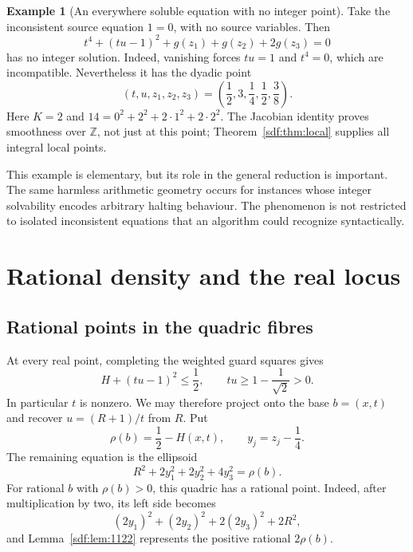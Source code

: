 \documentclass[11pt,a4paper]{article}
\theoremstyle{definition}
\newtheorem{example}[theorem]{Example}
\theoremstyle{remark}
\newcommand{\Z}{\mathbb Z}
\newcommand{\guard}{g}
\begin{document}
\begin{example}[An everywhere soluble equation with no integer point]\label{sdf:ex:one}
Take the inconsistent source equation $1=0$, with no source variables.
Then
\begin{equation}\label{sdf:eq:inconsistent}
 t^4+(tu-1)^2+\guard(z_1)+\guard(z_2)+2\guard(z_3)=0
\end{equation}
has no integer solution. Indeed, vanishing forces $tu=1$ and $t^4=0$,
which are incompatible. Nevertheless it has the dyadic point
\[
 \left(t,u,z_1,z_2,z_3\right)
 =\left(\frac12,3,\frac14,\frac12,\frac38\right).
\]
Here $K=2$ and $14=0^2+2^2+2\cdot1^2+2\cdot2^2$.
The Jacobian identity proves smoothness over $\Z$, not just at this point;
Theorem~\ref{sdf:thm:local} supplies all integral local points.
\end{example}

This example is elementary, but its role in the general reduction is
important. The same harmless arithmetic geometry occurs for instances whose
integer solvability encodes arbitrary halting behaviour. The phenomenon is
not restricted to isolated inconsistent equations that an algorithm could
recognize syntactically.

\section{Rational density and the real locus}\label{sdf:sec:real}

\subsection{Rational points in the quadric fibres}

At every real point, completing the weighted guard squares gives
\[
 H+(tu-1)^2\le\frac12,
 \qquad tu\ge1-\frac1{\sqrt2}>0.
\]
In particular $t$ is nonzero. We may therefore project onto the base
$b=(x,t)$ and recover $u=(R+1)/t$ from $R$. Put
\begin{equation}\label{sdf:eq:rho}
 \rho(b)=\frac12-H(x,t),\qquad y_j=z_j-\frac14.
\end{equation}
The remaining equation is the ellipsoid
\begin{equation}\label{sdf:eq:sphere}
 R^2+2y_1^2+2y_2^2+4y_3^2=\rho(b).
\end{equation}
For rational $b$ with $\rho(b)>0$, this quadric has a rational point.
Indeed, after multiplication by two, its left side becomes
\[
 (2y_1)^2+(2y_2)^2+2(2y_3)^2+2R^2,
\]
and Lemma~\ref{sdf:lem:1122} represents the positive rational $2\rho(b)$.
\end{document}
